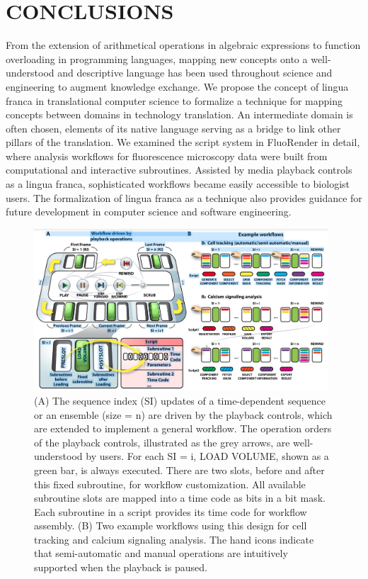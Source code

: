 \documentclass{IEEEcsmag}
\begin{document}
\section{CONCLUSIONS}

From the extension of arithmetical operations in algebraic expressions to function overloading in programming languages, mapping new concepts onto a well-understood and descriptive language has been used throughout science and engineering to augment knowledge exchange. We propose the concept of lingua franca in translational computer science to formalize a technique for mapping concepts between domains in technology translation. An intermediate domain is often chosen, elements of its native language serving as a bridge to link other pillars of the translation. We examined the script system in FluoRender in detail, where analysis workflows for fluorescence microscopy data were built from computational and interactive subroutines. Assisted by media playback controls as a lingua franca, sophisticated workflows became easily accessible to biologist users. The formalization of lingua franca as a technique also provides guidance for future development in computer science and software engineering.


\begin{figure}
\centerline{\includegraphics[width=26pc]{fig1.png}}
\caption{(A) The sequence index (SI) updates of a time-dependent sequence or an ensemble (size = n) are driven by the playback controls, which are extended to implement a general workflow. The operation orders of the playback controls, illustrated as the grey arrows, are well-understood by users. For each SI = i, LOAD VOLUME, shown as a green bar, is always executed. There are two slots, before and after this fixed subroutine, for workflow customization. All available subroutine slots are mapped into a time code as bits in a bit mask. Each subroutine in a script provides its time code for workflow assembly. (B) Two example workflows using this design for cell tracking and calcium signaling analysis. The hand icons indicate that semi-automatic and manual operations are intuitively supported when the playback is paused.\label{fig1}}\vspace*{-5pt}
\end{figure}
\end{document}
